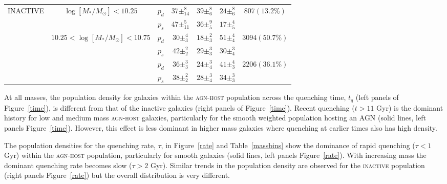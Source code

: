 \begin{table}
{{\begin{tabular}{c|c|c|c|c|c|c}
\multirow{6}{*}{INACTIVE}  & \multirow{2}{*}{$\log [M_*/M_{\odot}] < 10.25 $}                       & $p_d$     & $37\pm_{14}^{8}$                    & $39\pm_{6}^{8}$                    & $24\pm_{6}^{8}$        & \multirow{2}{*}{$807 (13.2\%)$}                      \\
                           &                                                 & $p_s$     & $47\pm_{11}^{5}$                    & $36\pm_{5}^{9}$                    & $17\pm_{5}^{4}$        &                                                      \\ \cline{2-7} 
                           & \multirow{2}{*}{$10.25 < \log [M_*/M_{\odot}] < 10.75$}                    & $p_d$     &          $30\pm_{3}^{4}$                          &       $18\pm_{3}^{2}$                            &    $51\pm_{4}^{4}$                   & \multirow{2}{*}{$3094 (50.7\%)$}                     \\
                           &                                                 & $p_s$     & $42\pm_{2}^{2}$            & $29\pm_{3}^{3}$   & $30\pm_{4}^{3}$ &                                                      \\ \cline{2-7} 
                           & {\multirow{2}{*}{$\log [M_*/M_{\odot}] > 10.75$}} & $p_d$     & $36\pm_{3}^{3}$            & $24\pm_{4}^{3}$         & $41\pm_{3}^{4}$ & \multicolumn{1}{l}{\multirow{2}{*}{$2206 (36.1\%)$}} \\
                           & \multicolumn{1}{l|}{}                           & $p_s$      & $38\pm_{2}^{2}$              & $28\pm_{4}^{3}$            & $34\pm_{3}^{3}$ & \multicolumn{1}{l}{}                                 \\ \hline                       
\end{tabular}}}
\end{table}

At all masses, the population density for galaxies within the \textsc{agn-host} population across the quenching time, $t_q$ (left panels of Figure~\ref{time}), is different from that of the inactive galaxies (right panels of Figure~\ref{time}). Recent quenching ($t > 11$ Gyr) is the dominant history for low and medium mass \textsc{agn-host} galaxies, particularly for the smooth weighted population hosting an AGN (solid lines, left panels Figure~\ref{time}). However, this effect is less dominant in higher mass galaxies where quenching at earlier times also has high density.


The population densities for the quenching rate, $\tau$, in Figure~\ref{rate} and Table~\ref{massbins} show the dominance of rapid quenching ($\tau < 1$ Gyr) within the \textsc{agn-host} population, particularly for smooth galaxies (solid lines, left panels Figure~\ref{rate}). With increasing mass the dominant quenching rate becomes slow ($\tau > 2$ Gyr). Similar trends in the population density are observed for the \textsc{inactive} population (right panels Figure~\ref{rate}) but the overall distribution is very different. 


